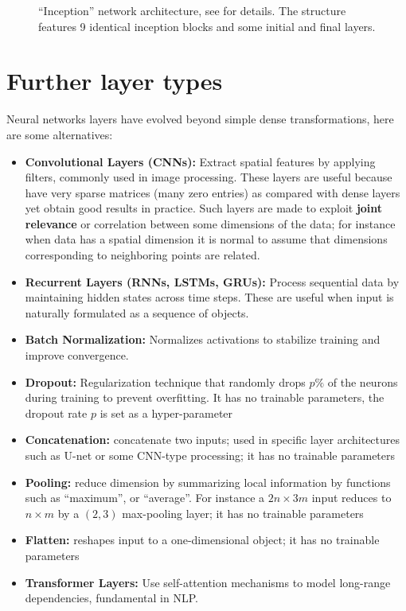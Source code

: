 \begin{figure}[h]\centering
\caption{``Inception'' network architecture, see \cite{turinici14} for details. The structure features 9 identical inception blocks and some initial and final layers.}\label{fig:ch7-inception}
\end{figure}

\section{Further layer types}

Neural networks layers have evolved beyond simple dense transformations, here are some alternatives:
\begin{itemize}
  \item \textbf{Convolutional Layers (CNNs):} Extract spatial features by applying filters, commonly used in image processing. These layers are useful because have very sparse matrices (many zero entries) as compared with dense layers yet obtain good results in practice. Such layers are made to exploit \textbf{joint relevance} or correlation between some dimensions of the data; for instance when data has a spatial dimension it is normal to assume that dimensions corresponding to neighboring points are related.
  \item \textbf{Recurrent Layers (RNNs, LSTMs, GRUs):} Process sequential data by maintaining hidden states across time steps. These are useful when input is naturally formulated as a sequence of objects.
  \item \textbf{Batch Normalization:} Normalizes activations to stabilize training and improve convergence.
  \item \textbf{Dropout:} Regularization technique that randomly drops $p\%$ of the neurons during training to prevent overfitting. It has no trainable parameters, the dropout rate $p$ is set as a hyper-parameter
  \item \textbf{Concatenation:} concatenate two inputs; used in specific layer architectures such as U-net or some CNN-type processing; it has no trainable parameters
  \item \textbf{Pooling:} reduce dimension by summarizing local information by functions such as ``maximum'', or ``average''. For instance a $2n \times 3m$ input reduces to $n \times m$ by a $(2, 3)$ max-pooling layer; it has no trainable parameters
  \item \textbf{Flatten:} reshapes input to a one-dimensional object; it has no trainable parameters
  \item \textbf{Transformer Layers:} Use self-attention mechanisms to model long-range dependencies, fundamental in NLP.
\end{itemize}

